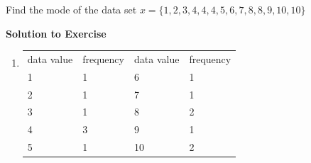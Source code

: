\begin{description}[noitemsep]
\begin{description}[noitemsep]
{\begin{mdframed}[linewidth=4, leftmargin=40, rightmargin=40]
\begin{exercise}
          \label{m39400*probfhsst!!!underscore!!!id1504}
          \label{m39400*id212220}Find the mode of the data set $x=\{1,2,3,4,4,4,5,6,7,8,8,9,10,10\}$ \par 
          \vspace{5pt}
          \label{m39400*solfhsst!!!underscore!!!id1507}\noindent\textbf{Solution to Exercise } \label{m39400*listfhsst!!!underscore!!!id1507}\begin{enumerate}[noitemsep, label=\textbf{Step} \textbf{\arabic*}. ] 
            \leftskip=20pt\rightskip=\leftskip\item  
          \begin{table}
        \begin{center}
      \label{m39400*id212318}
    \noindent
      \tablelasttail{}
      \begin{xtabular}[t]{|l|l|l|l|}\hline
        data value &
        frequency &
        data value &
        frequency%
     \tabularnewline{}
        1 &
        1 &
        6 &
        1%
     \tabularnewline{}
        2 &
        1 &
        7 &
        1%
     \tabularnewline{}
        3 &
        1 &
        8 &
        2%
     \tabularnewline{}
        4 &
        3 &
        9 &
        1%
     \tabularnewline{}
        5 &
        1 &
        10 &
        2%
     \tabularnewline{}

\end{xtabular}
\end{center}
\end{table}
\end{enumerate}
\end{exercise}
\end{mdframed}}
\end{description}
\end{description}
